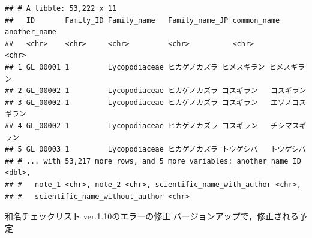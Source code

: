 \documentclass[
  a5paper,
  landscape,
  notitlepage]{report}
\begin{document}
\begin{verbatim}
## # A tibble: 53,222 x 11
##   ID       Family_ID Family_name   Family_name_JP common_name  another_name    
##   <chr>    <chr>     <chr>         <chr>          <chr>        <chr>           
## 1 GL_00001 1         Lycopodiaceae ヒカゲノカズラ ヒメスギラン ヒメスギラン    
## 2 GL_00002 1         Lycopodiaceae ヒカゲノカズラ コスギラン   コスギラン      
## 3 GL_00002 1         Lycopodiaceae ヒカゲノカズラ コスギラン   エゾノコスギラン
## 4 GL_00002 1         Lycopodiaceae ヒカゲノカズラ コスギラン   チシマスギラン  
## 5 GL_00003 1         Lycopodiaceae ヒカゲノカズラ トウゲシバ   トウゲシバ      
## # ... with 53,217 more rows, and 5 more variables: another_name_ID <dbl>,
## #   note_1 <chr>, note_2 <chr>, scientific_name_with_author <chr>,
## #   scientific_name_without_author <chr>
\end{verbatim}

\newpage

\fontsize{32pt}{32pt}\selectfont

\begin{center}
和名チェックリスト ver.1.10のエラーの修正   
バージョンアップで，修正される予定   
\end{center}

\fontsize{14pt}{14pt}\selectfont
\end{document}
